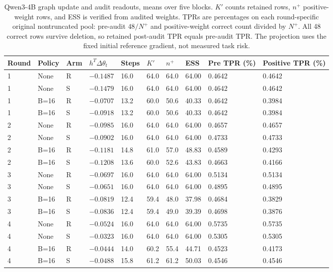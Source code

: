 \begin{table}[H]
\caption{Qwen3-4B graph update and audit readouts, means over five blocks. $K\prime$ counts retained rows, $n^+$ positive-weight rows, and ESS is verified from audited weights. TPRs are percentages on each round-specific original nontruncated pool: pre-audit $48/N^+$ and positive-weight correct count divided by $N^+$. All 48 correct rows survive deletion, so retained post-audit TPR equals pre-audit TPR. The projection uses the fixed initial reference gradient, not measured task risk.}
\label{tab:qwen4b-audit}
\centering\small\setlength{\tabcolsep}{3pt}
\begin{tabular}{@{}llllllllll@{}}
\toprule
Round & Policy & Arm & $h^T\Delta\theta_t$ & Steps & $K\prime$ & $n^+$ & ESS & Pre TPR (\%) & Positive TPR (\%)\\
\midrule
1 & None & R & $-0.1487$ & 16.0 & 64.0 & 64.0 & 64.00 & 0.4642 & 0.4642\\
1 & None & S & $-0.1479$ & 16.0 & 64.0 & 64.0 & 64.00 & 0.4642 & 0.4642\\
1 & B=16 & R & $-0.0707$ & 13.2 & 60.0 & 50.6 & 40.33 & 0.4642 & 0.3984\\
1 & B=16 & S & $-0.0918$ & 13.2 & 60.0 & 50.6 & 40.33 & 0.4642 & 0.3984\\
2 & None & R & $-0.0985$ & 16.0 & 64.0 & 64.0 & 64.00 & 0.4657 & 0.4657\\
2 & None & S & $-0.0902$ & 16.0 & 64.0 & 64.0 & 64.00 & 0.4733 & 0.4733\\
2 & B=16 & R & $-0.1181$ & 14.8 & 61.0 & 57.0 & 48.83 & 0.4589 & 0.4293\\
2 & B=16 & S & $-0.1208$ & 13.6 & 60.0 & 52.6 & 43.83 & 0.4663 & 0.4166\\
3 & None & R & $-0.0697$ & 16.0 & 64.0 & 64.0 & 64.00 & 0.5134 & 0.5134\\
3 & None & S & $-0.0651$ & 16.0 & 64.0 & 64.0 & 64.00 & 0.4895 & 0.4895\\
3 & B=16 & R & $-0.0819$ & 12.4 & 59.4 & 48.0 & 37.98 & 0.4684 & 0.3829\\
3 & B=16 & S & $-0.0836$ & 12.4 & 59.4 & 49.0 & 39.39 & 0.4698 & 0.3876\\
4 & None & R & $-0.0524$ & 16.0 & 64.0 & 64.0 & 64.00 & 0.5735 & 0.5735\\
4 & None & S & $-0.0323$ & 16.0 & 64.0 & 64.0 & 64.00 & 0.5305 & 0.5305\\
4 & B=16 & R & $-0.0444$ & 14.0 & 60.2 & 55.4 & 44.71 & 0.4523 & 0.4173\\
4 & B=16 & S & $-0.0488$ & 15.8 & 61.2 & 61.2 & 50.03 & 0.4546 & 0.4546\\
\bottomrule
\end{tabular}
\end{table}
